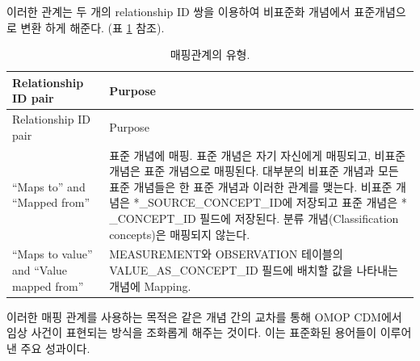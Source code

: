 \documentclass[11pt]{book}
\theoremstyle{definition}
\theoremstyle{definition}
\theoremstyle{definition}
\theoremstyle{remark}
\begin{document}
이러한 관계는 두 개의 relationship ID 쌍을 이용하여 비표준화 개념에서
표준개념으로 변환 하게 해준다. (표 \ref{tab:mappingRelationships} 참조).

\begin{longtable}[]{@{}ll@{}}
\caption{\label{tab:mappingRelationships} 매핑관계의 유형.}\tabularnewline
\toprule
\begin{minipage}[b]{0.20\columnwidth}\raggedright\strut
Relationship ID pair\strut
\end{minipage} & \begin{minipage}[b]{0.71\columnwidth}\raggedright\strut
Purpose\strut
\end{minipage}\tabularnewline
\midrule
\endfirsthead
\toprule
\begin{minipage}[b]{0.20\columnwidth}\raggedright\strut
Relationship ID pair\strut
\end{minipage} & \begin{minipage}[b]{0.71\columnwidth}\raggedright\strut
Purpose\strut
\end{minipage}\tabularnewline
\midrule
\endhead
\begin{minipage}[t]{0.20\columnwidth}\raggedright\strut
``Maps to'' and ``Mapped from''\strut
\end{minipage} & \begin{minipage}[t]{0.71\columnwidth}\raggedright\strut
표준 개념에 매핑. 표준 개념은 자기 자신에게 매핑되고, 비표준 개념은 표준
개념으로 매핑된다. 대부분의 비표준 개념과 모든 표준 개념들은 한 표준
개념과 이러한 관계를 맺는다. 비표준 개념은 *\_SOURCE\_CONCEPT\_ID에
저장되고 표준 개념은 * \_CONCEPT\_ID 필드에 저장된다. 분류
개념(Classification concepts)은 매핑되지 않는다.\strut
\end{minipage}\tabularnewline
\begin{minipage}[t]{0.20\columnwidth}\raggedright\strut
``Maps to value'' and ``Value mapped from''\strut
\end{minipage} & \begin{minipage}[t]{0.71\columnwidth}\raggedright\strut
MEASUREMENT와 OBSERVATION 테이블의 VALUE\_AS\_CONCEPT\_ID 필드에 배치할
값을 나타내는 개념에 Mapping.\strut
\end{minipage}\tabularnewline
\bottomrule
\end{longtable}

이러한 매핑 관계를 사용하는 목적은 같은 개념 간의 교차를 통해 OMOP
CDM에서 임상 사건이 표현되는 방식을 조화롭게 해주는 것이다. 이는
표준화된 용어들이 이루어 낸 주요 성과이다.
\end{document}
